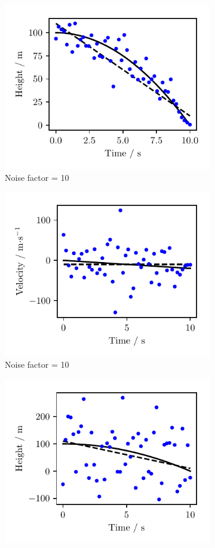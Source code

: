 \begin{figure}[htbp]
\begin{subfigure}[b]{0.5\textwidth}
    \includegraphics{Figures/noise_010_model.pdf}
		\caption{Noise factor = \num{10}}\label{fig:1c}
	\end{subfigure}\hfill
	\begin{subfigure}[b]{0.5\textwidth}
		\centering
    \includegraphics{Figures/noise_010_derivative.pdf}
		\caption{Noise factor = \num{10}}\label{fig:1d}
	\end{subfigure}\hfill
	\begin{subfigure}[b]{0.5\textwidth}
		\centering
    \includegraphics{Figures/noise_100_model.pdf}

\end{subfigure}
\end{figure}
